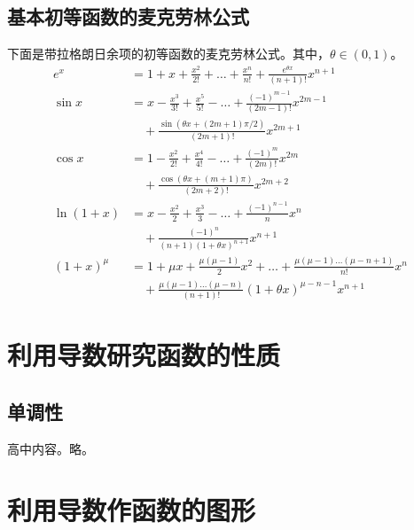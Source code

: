 \subsection{基本初等函数的麦克劳林公式}
下面是带拉格朗日余项的初等函数的麦克劳林公式。其中，$\theta\in (0,1)$。
\begin{align*}
  e^x &= 1+x+\frac{x^2}{2!}+\dots+\frac{x^n}{n!}
    + \frac{e^{\theta x}}{(n+1)!}x^{n+1} \\
  \sin x &= x - \frac{x^3}{3!} + \frac{x^5}{5!} -\dots
    + \frac{(-1)^{m-1}}{(2m-1)!}x^{2m-1}\\
    &\quad + \frac{\sin(\theta x + (2m+1)\pi / 2)}{(2m+1)!}x^{2m+1}\\
  \cos x &= 1 - \frac{x^2}{2!} + \frac{x^4}{4!} -\dots
    + \frac{(-1)^{m}}{(2m)!}x^{2m}\\
    &\quad + \frac{\cos(\theta x + (m+1)\pi)}{(2m+2)!}x^{2m+2} \\
  \ln(1+x) &= x -\frac{x^2}{2} + \frac{x^3}{3}-\dots
    + \frac{(-1)^{n-1}}{n}x^n \\
    &\quad + \frac{(-1)^{n}}{(n+1)(1+\theta x)^{n+1}}x^{n+1} \\
  (1+x)^{\mu} &= 1 + \mu x + \frac{\mu(\mu-1)}{2}x^2+\dots
    + \frac{\mu(\mu-1)\dots(\mu-n+1)}{n!}x^n \\
    &\quad + \frac{\mu(\mu-1)\dots(\mu-n)}{(n+1)!}
    (1+\theta x)^{\mu-n-1}x^{n+1}
\end{align*}

\section{利用导数研究函数的性质}

\subsection{单调性}
高中内容。略。

\section{利用导数作函数的图形}
